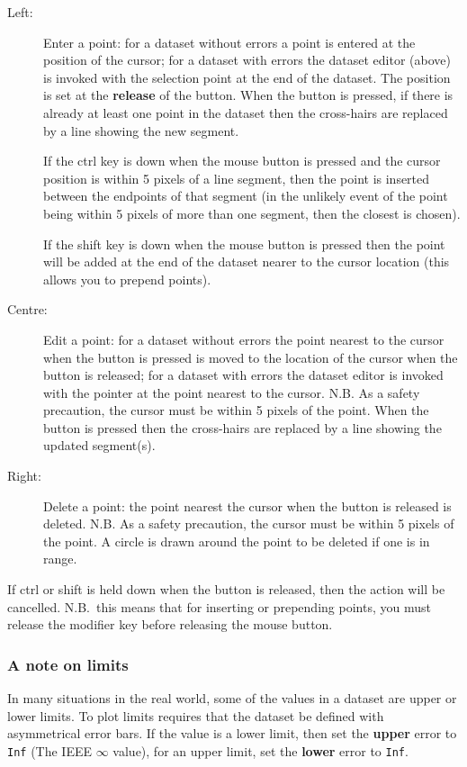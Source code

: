 \documentclass[11pt,twoside,english]{article}
\begin{document}
\begin{description}
\item [Left:]Enter a point: for a dataset without errors a point is
  entered at the position of the cursor; for a dataset with errors the
  dataset editor (above) is invoked with the selection point at the end
  of the dataset. The position is set at the \textbf{release} of the
  button. When the button is pressed, if there is already at least one
  point in the dataset then the cross-hairs are replaced by a line
  showing the new segment. 

  If the \textsf{ctrl} key is down when the mouse button is pressed and
  the cursor position is within 5 pixels of a line segment, then the
  point is inserted between the endpoints of that segment (in the
  unlikely event of the point being within 5 pixels of more than one
  segment, then the closest is chosen).

  If the \textsf{shift} key is down when the mouse button is pressed
  then the point will be added at the end of the dataset nearer to the
  cursor location (this allows you to prepend points).

\item [Centre:]Edit a point: for a dataset without errors the point
  nearest to the cursor when the button is pressed is moved to the
  location of the cursor when the button is released; for a dataset
  with errors the dataset editor is invoked with the pointer at the
  point nearest to the cursor. N.B. As a safety precaution, the cursor
  must be within 5 pixels of the point. When the button is pressed then
  the cross-hairs are replaced by a line showing the updated
  segment(s).
\item [Right:]Delete a point: the point nearest the cursor when the
  button is released is deleted.  N.B. As a safety precaution, the
  cursor must be within 5 pixels of the point. A circle is drawn around
  the point to be deleted if one is in range.
\end{description}
If \textsf{ctrl} or \textsf{shift} is held down when the button is
released, then the action will be cancelled. N.B.\ this means that for
inserting or prepending points, you must release the modifier key
before releasing the mouse button.

\subsubsection{A note on limits}


In many situations in the real world, some of the values in a dataset
are upper or lower limits. To plot limits requires that the dataset be
defined with asymmetrical error bars. If the value is a lower limit,
then set the \textbf{upper} error to \texttt{Inf} (The IEEE
$\infty$ value), for an upper limit, set the \textbf{lower} error to
\texttt{Inf}.
\end{document}
